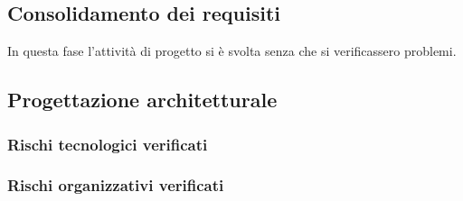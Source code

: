 \subsection{Consolidamento dei requisiti}
In questa fase l'attività di progetto si è svolta senza che si verificassero problemi.

\subsection{Progettazione architetturale}

\subsubsection{Rischi tecnologici verificati}
\def\problems{
    {   
        RT1,
        Technology Baseline,
        Nessun membro del gruppo è pratico o ha conoscenze approfondite delle tecnologie coinvolte per la realizzazione del POC.,
        È stato dedicato un periodo di 2 settimane all'autoapprendimento delle tecnologie coinvolte{,} in particolare è stato deciso che ogni membro del gruppo deve avere per ognuna una conoscenza almeno superficiale.
    },
}

\subsubsection{Rischi organizzativi verificati}
\def\problems{
    {
        RO1,
        Technology Baseline,
        Causato dal rischio RT1{,} Technology Baseline{,} i programmatori hanno avuto bisogno di più tempo di quanto preventivato per utilizzare efficacemente le tecnologie richieste per la realizzazione del POC.,
        È stato tolto del tempo alla progettazione per concentrarsi maggiormente alla programmazione.
    },
    {
        RO2,
        Sessione invernale,
        La sessione invernale è stata particolarmente impegnativa per la maggior parte del gruppo.,
        È stata utilizzata la revisione a modalità \noexpand\textit{Sportello}: il team ha deciso di ritardare la consegna della Technology Baseline{,} nonché la consegna dei documenti per la RP rispettivamente al 2021-03-09 e al 2021-03-10.
    },
}

